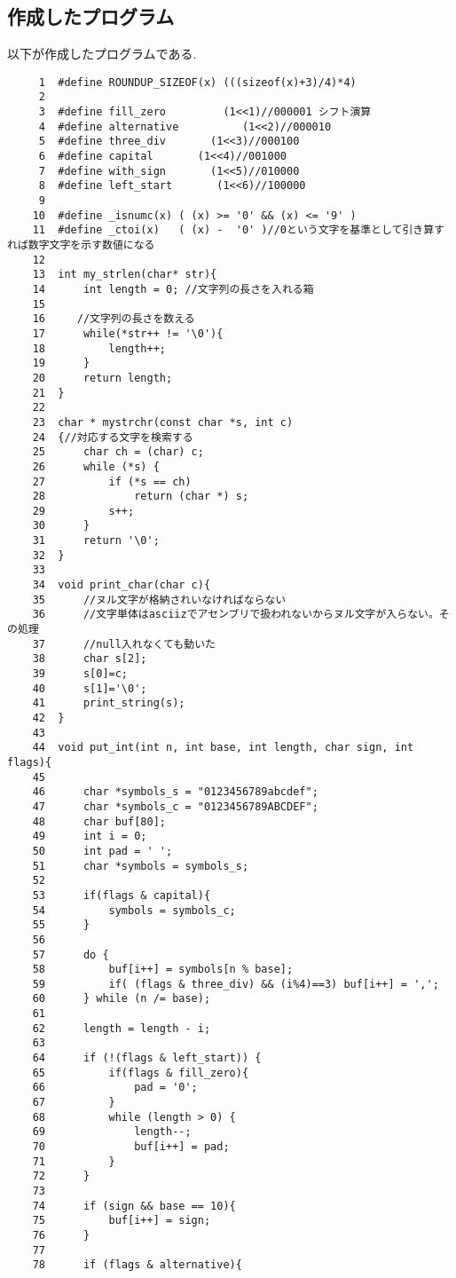 \documentclass[a4j,11pt]{jarticle}
\begin{document}
  \subsection{作成したプログラム}
以下が作成したプログラムである.
\begin{verbatim}
     1	#define ROUNDUP_SIZEOF(x) (((sizeof(x)+3)/4)*4)
     2	
     3	#define fill_zero         (1<<1)//000001 シフト演算
     4	#define alternative          (1<<2)//000010
     5	#define three_div       (1<<3)//000100
     6	#define capital       (1<<4)//001000
     7	#define with_sign       (1<<5)//010000
     8	#define left_start       (1<<6)//100000
     9	
    10	#define _isnumc(x) ( (x) >= '0' && (x) <= '9' )
    11	#define _ctoi(x)   ( (x) -  '0' )//0という文字を基準として引き算すれば数字文字を示す数値になる
    12	
    13	int my_strlen(char* str){
    14	    int length = 0; //文字列の長さを入れる箱
    15	 
    16	   //文字列の長さを数える
    17	    while(*str++ != '\0'){
    18	        length++;
    19	    }
    20	    return length;
    21	}
    22	
    23	char * mystrchr(const char *s, int c)
    24	{//対応する文字を検索する
    25	    char ch = (char) c;
    26	    while (*s) {
    27	        if (*s == ch)
    28	            return (char *) s;
    29	        s++;
    30	    }
    31	    return '\0';
    32	}
    33	
    34	void print_char(char c){
    35	    //ヌル文字が格納されいなければならない
    36	    //文字単体はasciizでアセンブリで扱われないからヌル文字が入らない。その処理
    37	    //null入れなくても動いた
    38	    char s[2];
    39	    s[0]=c;
    40	    s[1]='\0';
    41	    print_string(s);
    42	}
    43	
    44	void put_int(int n, int base, int length, char sign, int flags){
    45	
    46	    char *symbols_s = "0123456789abcdef";
    47	    char *symbols_c = "0123456789ABCDEF";
    48	    char buf[80];
    49	    int i = 0;
    50	    int pad = ' ';
    51	    char *symbols = symbols_s;
    52	
    53	    if(flags & capital){
    54	        symbols = symbols_c;
    55	    }
    56	
    57	    do {
    58	        buf[i++] = symbols[n % base];
    59	        if( (flags & three_div) && (i%4)==3) buf[i++] = ',';
    60	    } while (n /= base);
    61	
    62	    length = length - i;
    63	
    64	    if (!(flags & left_start)) {
    65	        if(flags & fill_zero){
    66	            pad = '0';
    67	        }
    68	        while (length > 0) { 
    69	            length--; 
    70	            buf[i++] = pad;
    71	        }
    72	    }
    73	
    74	    if (sign && base == 10){
    75	        buf[i++] = sign;
    76	    }
    77	    
    78	    if (flags & alternative){

\end{verbatim}
\end{document}
